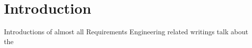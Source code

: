 \chapter{Introduction}
\label{chap:intro}

Introductions of almost all Requirements Engineering related writings talk about the 